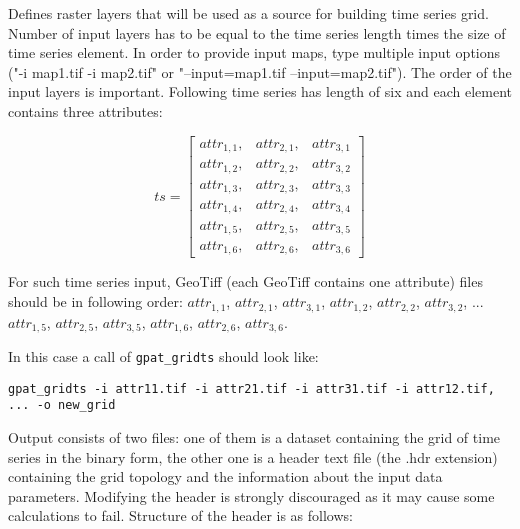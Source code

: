
Defines raster layers that will be used as a source for building time series grid.
Number of input layers has to be equal to the time series length times the size of time series element.
In order to provide input maps, type multiple input options ("-i map1.tif -i map2.tif" or "--input=map1.tif --input=map2.tif").
The order of the input layers is important. 
Following time series has length of six and each element contains three attributes:

\begingroup
\begin{equation} \label{eq:time_serie}
ts = \begin{bmatrix}
attr_{1,1}, & attr_{2,1}, &  attr_{3,1} \\ 
attr_{1,2}, & attr_{2,2}, &  attr_{3,2} \\ 
attr_{1,3}, & attr_{2,3}, &  attr_{3,3} \\ 
attr_{1,4}, & attr_{2,4}, &  attr_{3,4} \\
attr_{1,5}, & attr_{2,5}, &  attr_{3,5} \\
attr_{1,6}, & attr_{2,6}, &  attr_{3,6}
\end{bmatrix}
\end{equation}
\endgroup

For such time series input, GeoTiff (each GeoTiff contains one attribute) files should be in following order:
$attr_{1,1}$, $attr_{2,1}$, $attr_{3,1}$,
$attr_{1,2}$, $attr_{2,2}$, $attr_{3,2}$, 
 ... 
$attr_{1,5}$, $attr_{2,5}$, $attr_{3,5}$,
$attr_{1,6}$, $attr_{2,6}$, $attr_{3,6}$.

In this case a call of {\tt gpat\_gridts} should look like: \\

\begin{minipage}{\linewidth}
\begin{lstlisting}
gpat_gridts -i attr11.tif -i attr21.tif -i attr31.tif -i attr12.tif, ... -o new_grid
\end{lstlisting}
\end{minipage}


Output consists of two files: one of them is a dataset containing the grid of time series in the binary form, the other one is a header text file (the .hdr extension) containing the grid topology and the information about the input data parameters.
Modifying the header is strongly discouraged as it may cause some calculations to fail. 
Structure of the header is as follows:\\


